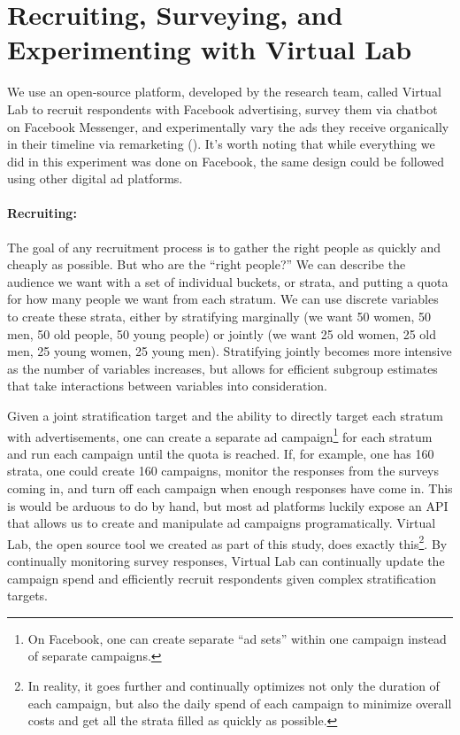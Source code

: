 \documentclass[a4paper,12pt]{article}
\begin{document}
\section{Recruiting, Surveying, and Experimenting with Virtual Lab} \label{recruiting-on-facebook}

We use an open-source platform, developed by the research team, called Virtual Lab to recruit respondents with Facebook advertising, survey them via chatbot on Facebook Messenger, and experimentally vary the ads they receive organically in their timeline via remarketing (\cite{Rao2020}). It's worth noting that while everything we did in this experiment was done on Facebook, the same design could be followed using other digital ad platforms. 

\paragraph{Recruiting:} The goal of any recruitment process is to gather the right people as quickly and cheaply as possible. But who are the ``right people?'' We can describe the audience we want with a set of individual buckets, or strata, and putting a quota for how many people we want from each stratum. We can use discrete variables to create these strata, either by stratifying marginally (we want 50 women, 50 men, 50 old people, 50 young people) or jointly (we want 25 old women, 25 old men, 25 young women, 25 young men). Stratifying jointly becomes more intensive as the number of variables increases, but allows for efficient subgroup estimates that take interactions between variables into consideration.

Given a joint stratification target and the ability to directly target each stratum with advertisements, one can create a separate ad campaign\footnote{On Facebook, one can create separate ``ad sets'' within one campaign instead of separate campaigns.} for each stratum and run each campaign until the quota is reached. If, for example, one has 160 strata, one could create 160 campaigns, monitor the responses from the surveys coming in, and turn off each campaign when enough responses have come in. This is would be arduous to do by hand, but most ad platforms luckily expose an API that allows us to create and manipulate ad campaigns programatically. Virtual Lab, the open source tool we created as part of this study, does exactly this\footnote{In reality, it goes further and continually optimizes not only the duration of each campaign, but also the daily spend of each campaign to minimize overall costs and get all the strata filled as quickly as possible.}. By continually monitoring survey responses, Virtual Lab can continually update the campaign spend and efficiently recruit respondents given complex stratification targets.
\end{document}
